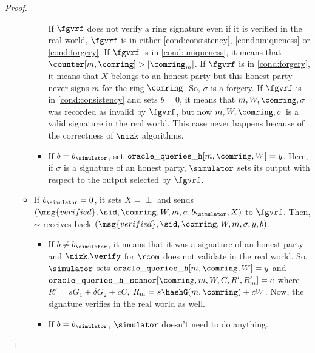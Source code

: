 \begin{proof}
\begin{itemize}
\begin{itemize}
\begin{itemize}
				If $ \fgvrf $ does not verify a ring signature even if  it is verified in the real world, $ \fgvrf $ is in either \ref{cond:consistency}, \ref{cond:uniqueness} or \ref{cond:forgery}.
				If $ \fgvrf $ is in \ref{cond:uniqueness}, it means that $ \counter[m,\comring] > |\comring_m| $. If $ \fgvrf $ is in \ref{cond:forgery}, it means that $ X $ belongs to an honest party but this honest party never signs $ m $ for the ring $ \comring $. So, $ \sigma $ is a forgery.	If $ \fgvrf $ is in  \ref{cond:consistency} and sets $ b =0 $, it means that $ m, W, \comring, \sigma $ was recorded as invalid by $ \fgvrf $, but now $ m, W, \comring, \sigma $ is a valid signature in the real world. 
				This case never happens because of the correctness of $ \nizk $ algorithms. 
				
				\item If $ b = b_\simulator $, set $ \mathtt{oracle\_queries\_h}[m, \comring,W] = y $. Here, if $ \sigma $ is a signature of an honest party, $ \simulator $ sets its output with respect to the output selected by $ \fgvrf $. 
			\end{itemize}
			\item If $ b_\simulator = 0 $, it sets $ X = \perp $ and sends  $ (\msg{verified}, \sid, \comring, W, m, \sigma, b_\simulator, X) $ to $ \fgvrf $. Then, $ \sim $ receives back $ (\msg{verified}, \sid, \comring, W, m, \sigma, y, b) $. 
			\begin{itemize}
				\item If $ b \neq b_\simulator $, it means that it was a signature of an honest party and $ \nizk.\verify $ for $ \rcom $ does not validate in the real world. So, $ \simulator $ sets $ \mathtt{oracle\_queries\_h}[m, \comring,W] = y $ and $ \mathtt{oracle\_queries\_h\_schnor}[\comring, m, W, C, R', R_m'] = c $ where $ R' = sG_1 + \delta G_2+ cC  $, $ R_m = s \hashG(m,\comring) + cW$. 
				Now, the signature verifies in the real world as well.
				\item If $ b = b_\simulator $, $ \simulator $ doesn't need to do anything.
			\end{itemize}
			

\end{itemize}
\end{itemize}
\end{proof}
